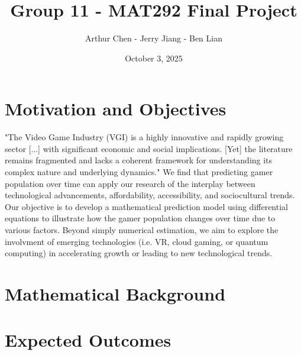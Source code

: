\documentclass{article}
\title{\vspace{-4cm}Group 11 - MAT292 Final Project}
\author{Arthur Chen - Jerry Jiang - Ben Lian}
\date{October 3, 2025}
\begin{document}
\maketitle

\section{Motivation and Objectives}
"The Video Game Industry (VGI) is a highly innovative and rapidly growing 
sector [...] with significant economic and social implications. [Yet] the 
literature remains fragmented and lacks a coherent framework for 
understanding its complex nature and underlying dynamics." \cite{Goh2023} 
We find that predicting gamer population over time can apply our research 
of the interplay between technological advancements, affordability, 
accessibility, and sociocultural trends.\\

\noindent Our objective is to develop a mathematical prediction model using 
differential equations to illustrate how the gamer population changes over 
time due to various factors. Beyond simply numerical estimation, we aim to 
explore the involvment of emerging technologies (i.e. VR, cloud gaming, or 
quantum computing) in accelerating growth or leading to new technological 
trends.

\section{Mathematical Background}



\section{Expected Outcomes}




\end{document}
